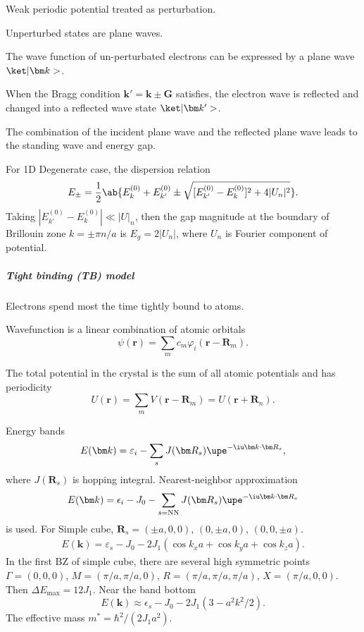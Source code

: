 \begin{enumext}
  \item Weak periodic potential treated as perturbation.
  \item Unperturbed states are plane waves.
  \item The wave function of un-perturbated electrons can be expressed by a
  plane wave $\ket|\bm k>$.
  \item When the Bragg condition $\bm k' = \bm k \pm \bm G$ satisfies, the
  electron wave is reflected and changed into a reflected wave
  state $\ket|\bm k'>$.
  \item The combination of the incident plane wave and the reflected plane wave
  leads to the standing wave and energy gap.
\end{enumext}
For 1D Degenerate case, the dispersion relation
\[
  E_\pm = \frac12\ab\{E_k^{(0)} + E_{k'}^{(0)}
    \pm \sqrt{[E_{k'}^{(0)} - E_k^{(0)}]^2 + 4|U_n|^2}\}.
\]
Taking $|E_{k'}^{(0)} - E_k^{(0)}| \ll |U|_n$, then the gap magnitude
at the boundary of Brillouin zone $k = \pm \pi n/a$ is $E_g = 2|U_n|$,
where $U_n$ is Fourier component of potential.

\subparagraph{Tight binding (TB) model}

\begin{enumext}
  \item Electrons spend most the time tightly bound to atoms.
  \item Wavefunction is a linear combination of atomic orbitals
  \[
    \psi(\bm r) = \sum_m c_m \varphi_i(\bm r - \bm R_m).
  \]
  \item The total potential in the crystal is the sum of all atomic potentials
  and has periodicity
  \[
    U(\bm r) = \sum_m V(\bm r - \bm R_m) = U(\bm r + \bm R_n).
  \]
\end{enumext}
Energy bands
\[
  E(\bm k) = \varepsilon_i - \sum_s J(\bm R_s) \upe^{-\iu\bm k \cdot \bm R_s},
\]
where $J(\bm R_s)$ is hopping integral.
Nearest-neighbor approximation
\[
  E(\bm k) = \epsilon_i - J_0
  - \sum_{s = \text{NN}} J(\bm R_s) \upe^{-\iu\bm k\cdot\bm R_s}
\]
is used. For Simple cube, $\bm R_s = (\pm a, 0, 0)$, $(0, \pm a, 0)$,
$(0, 0, \pm a)$.
\begin{gather*}
  E(\bm k)
= \varepsilon_s - J_0 - 2J_1 (\cos k_x a + \cos k_y a + \cos k_z a).
\end{gather*}
In the first BZ of simple cube, there are several high
symmetric points $\Gamma = (0,0,0)$, $M = (\pi/a,\pi/a,0)$,
$R = (\pi/a,\pi/a,\pi/a)$, $X = (\pi/a,0,0)$.
Then $\Delta E_{\max} = 12J_1$.
Near the band bottom
\[
  E(\bm k) \approx \epsilon_s - J_0 - 2J_1(3 - a^2k^2/2).
\]
The effective mass $m^* = \hbar^2/(2J_1 a^2)$.


